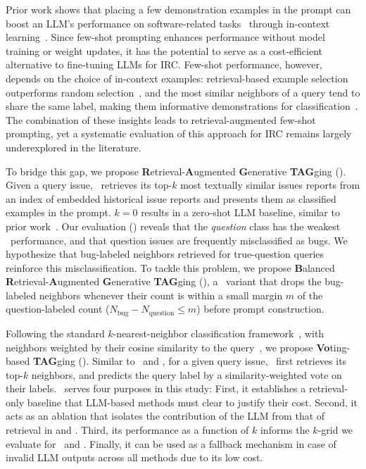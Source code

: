 Prior work shows that placing a few demonstration examples in the prompt can boost an LLM's performance on software-related tasks~\cite{assi2026llm, le2023log} through in-context learning~\cite{brown2020language}. Since few-shot prompting enhances performance without model training or weight updates, it has the potential to serve as a cost-efficient alternative to fine-tuning LLMs for IRC. Few-shot performance, however, depends on the choice of in-context examples: retrieval-based example selection outperforms random selection~\cite{liu2022makes}, and the most similar neighbors of a query tend to share the same label, making them informative demonstrations for classification~\cite{cover1967nearest}. The combination of these insights leads to retrieval-augmented few-shot prompting, yet a systematic evaluation of this approach for IRC remains largely underexplored in the literature.

To bridge this gap, we propose \textbf{R}etrieval-\textbf{A}ugmented \textbf{G}enerative \textbf{TAG}ging (\ragtag). Given a query issue, \ragtag\ retrieves its top-$k$ most textually similar issues reports from an index of embedded historical issue reports and presents them as classified examples in the prompt. $k{=}0$ results in a zero-shot LLM baseline, similar to prior work~\cite{colavito2025benchmarking}. Our evaluation () reveals that the \emph{question} class has the weakest \ragtag\ performance, and that question issues are frequently misclassified as bugs. We hypothesize that bug-labeled neighbors retrieved for true-question queries reinforce this misclassification. To tackle this problem, we propose \textbf{B}alanced \textbf{R}etrieval-\textbf{A}ugmented \textbf{G}enerative \textbf{TAG}ging (\bragtag), a \ragtag\ variant that drops the bug-labeled neighbors whenever their count is within a small margin $m$ of the question-labeled count ($N_\text{bug} - N_\text{question} \le m$) before prompt construction.

Following the standard $k$-nearest-neighbor classification framework~\cite{cover1967nearest}, with neighbors weighted by their cosine similarity to the query~\cite{dudani1976distance}, we propose \textbf{Vo}ting-based \textbf{TAG}ging (\votag). Similar to \ragtag\ and \bragtag, for a given query issue, \votag\ first retrieves its top-$k$ neighbors, and predicts the query label by a similarity-weighted vote on their labels. \votag\ serves four purposes in this study: First, it establishes a retrieval-only baseline that LLM-based methods must clear to justify their cost. Second, it acts as an ablation that isolates the contribution of the LLM from that of retrieval in \ragtag and \bragtag. Third, its performance as a function of $k$ informs the $k$-grid we evaluate for \ragtag\ and \bragtag. Finally, it can be used as a fallback mechanism in case of invalid LLM outputs across all methods due to its low cost.

